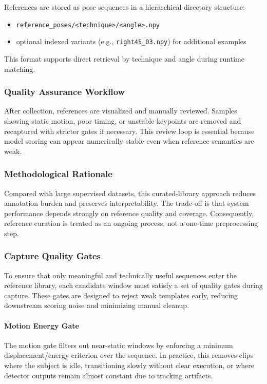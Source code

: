 \documentclass[12pt]{article}
\begin{document}
{References are stored as pose sequences in a hierarchical directory structure:

\begin{itemize}
    \item \texttt{reference\_poses/<technique>/<angle>.npy}
    \item optional indexed variants (e.g., \texttt{right45\_03.npy}) for additional examples
\end{itemize}

This format supports direct retrieval by technique and angle during runtime matching.

\subsubsection{Quality Assurance Workflow}

After collection, references are visualized and manually reviewed. Samples showing static motion, poor timing, or unstable keypoints are removed and recaptured with stricter gates if necessary. This review loop is essential because model scoring can appear numerically stable even when reference semantics are weak.

\subsubsection{Methodological Rationale}

Compared with large supervised datasets, this curated-library approach reduces annotation burden and preserves interpretability. The trade-off is that system performance depends strongly on reference quality and coverage. Consequently, reference curation is treated as an ongoing process, not a one-time preprocessing step.

\subsubsection{Capture Quality Gates}

To ensure that only meaningful and technically useful sequences enter the reference library, each candidate window must satisfy a set of quality gates during capture. These gates are designed to reject weak templates early, reducing downstream scoring noise and minimizing manual cleanup.

\paragraph{Motion Energy Gate}
The motion gate filters out near-static windows by enforcing a minimum displacement/energy criterion over the sequence. In practice, this removes clips where the subject is idle, transitioning slowly without clear execution, or where detector outputs remain almost constant due to tracking artifacts.

}
\end{document}

